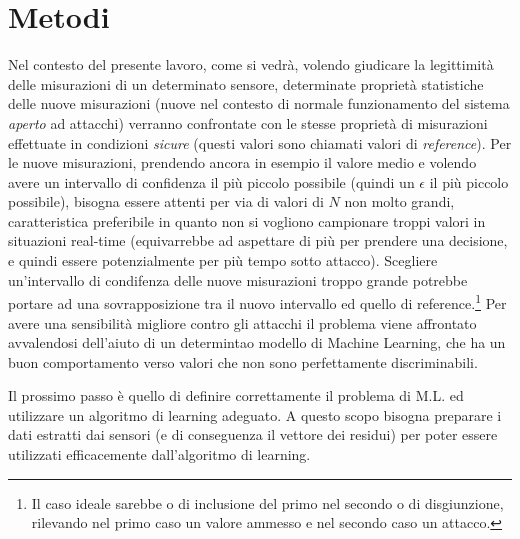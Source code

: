\documentclass[Lau,binding=0.6cm,noexaminfo]{sapthesis}
\begin{document}

\chapter{Metodi}\label{chap:3}


Nel contesto del presente lavoro, come si vedr\`a, volendo giudicare la legittimit\`a delle misurazioni di un determinato sensore, determinate propriet\`a statistiche delle nuove misurazioni (nuove nel contesto di normale 
funzionamento del sistema \textit{aperto} ad attacchi) verranno confrontate con le stesse propriet\`a di misurazioni effettuate in condizioni \textit{sicure} (questi valori sono chiamati valori di \textit{reference}). 
Per le nuove misurazioni, prendendo ancora in esempio il valore medio e volendo avere un intervallo di confidenza il pi\`u piccolo possibile (quindi un $\epsilon$ il pi\`u piccolo possibile), bisogna essere attenti per via di valori di $N$ non molto grandi,
caratteristica preferibile in quanto non si vogliono campionare troppi valori in situazioni real-time (equivarrebbe ad aspettare di pi\`u per prendere una decisione, e quindi essere potenzialmente per più tempo sotto attacco).
Scegliere un'intervallo di condifenza delle nuove misurazioni troppo grande potrebbe portare ad una sovrapposizione tra il nuovo intervallo ed quello di reference.\footnote{Il caso ideale sarebbe o di inclusione del primo nel secondo o di disgiunzione, rilevando nel primo caso un valore ammesso e nel secondo caso un attacco.}
Per avere una sensibilit\`a migliore contro gli attacchi il problema viene affrontato avvalendosi dell'aiuto di un determintao modello di Machine Learning, 
che ha un buon comportamento verso valori che non sono perfettamente discriminabili.

Il prossimo passo \`e quello di definire correttamente il problema di M.L. ed utilizzare un algoritmo di learning adeguato.
A questo scopo bisogna preparare i dati estratti dai sensori (e di conseguenza il vettore dei residui) per poter essere utilizzati efficacemente dall'algoritmo di learning.
\end{document}
